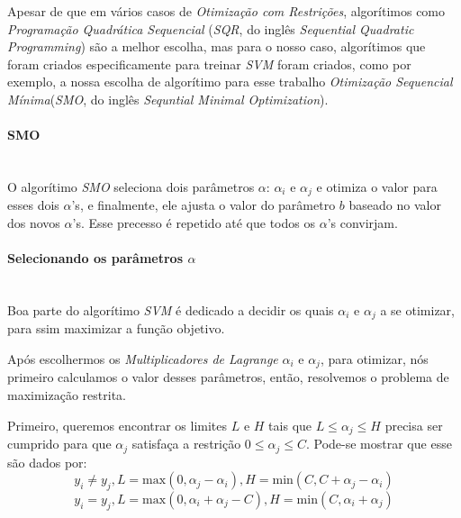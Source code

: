 \documentclass{article}
\begin{document}
Apesar de que em vários casos de \textit{Otimização com Restrições}, algorítimos como \textit{Programação Quadrática Sequencial} (\textit{SQR}, do inglês \textit{Sequential Quadratic Programming})\cite{Ademir} são a melhor escolha, mas para o nosso caso, algorítimos que foram criados especificamente para treinar \textit{SVM} foram criados, como por exemplo, a nossa escolha de algorítimo para esse trabalho \textit{Otimização Sequencial Mínima}(\textit{SMO}, do inglês \textit{Sequntial Minimal Optimization})\cite{platt}.

\paragraph{SMO} \hspace{0pt}\\

O algorítimo \textit{SMO} seleciona dois parâmetros \(\alpha\): \(\alpha_i\) e \(\alpha_j\) e otimiza o valor para esses dois \(\alpha\)'s, e finalmente, ele ajusta o valor do parâmetro \(b\) baseado no valor dos novos \(\alpha\)'s. Esse precesso é repetido até que todos os \(\alpha\)'s convirjam.

\paragraph{Selecionando os parâmetros \(\alpha\)} \hspace{0pt}\\

Boa parte do algorítimo \textit{SVM} é dedicado a decidir os quais \(\alpha_i\) e \(\alpha_j\) a se otimizar, para ssim maximizar a função objetivo.

Após escolhermos os \textit{Multiplicadores de Lagrange} \(\alpha_i\) e \(\alpha_j\), para otimizar, nós primeiro calculamos o valor desses parâmetros, então, resolvemos o problema de maximização restrita.

Primeiro, queremos encontrar os limites \(L\) e \(H\) tais que \(L\leq\alpha_j\leq H\) precisa ser cumprido para que \(\alpha_j\) satisfaça a restrição \(0\leq\alpha_j\leq C\). 
Pode-se mostrar que esse são dados por:
\begin{equation}\label{case1}
    y_i\neq y_j, L = \text{max}(0,\alpha_j-\alpha_i), H=\text{min}(C,C+\alpha_j-\alpha_i)
\end{equation}
\begin{equation}\label{case2}
    y_i=y_j, L = \text{max}(0,\alpha_i+\alpha_j-C), H=\text{min}(C,\alpha_i+\alpha_j)
\end{equation}
\end{document}

